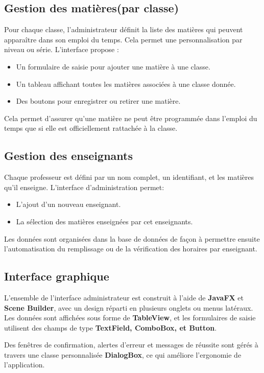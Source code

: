 \documentclass[english,12pt,a4paper]{report}
\begin{document}
 \subsection{Gestion des matières(par classe)}
 Pour chaque classe, l’administrateur définit la liste des matières qui peuvent apparaître dans son emploi du temps. Cela permet une personnalisation par niveau ou série. L’interface propose :
 \begin{itemize}
 	\item Un formulaire de saisie pour ajouter une matière à une classe.
 	\item Un tableau affichant toutes les matières associées à une classe donnée.
 	\item Des boutons pour enregistrer ou retirer une matière.
 \end{itemize}
 Cela permet d’assurer qu’une matière ne peut être programmée dans l’emploi du temps que si elle est officiellement rattachée à la classe.
 \subsection{Gestion des enseignants}
 Chaque professeur est défini par un nom complet, un identifiant, et les matières qu’il enseigne. L’interface d’administration permet:
 \begin{itemize}
 	\item L'ajout d’un nouveau enseignant.
 	\item La sélection des matières enseignées par cet enseignants.
 \end{itemize}
 Les données sont organisées dans la base de données de façon à permettre ensuite l’automatisation du remplissage ou de la vérification des horaires par enseignant.
 \subsection{Interface graphique}
 L’ensemble de l’interface administrateur est construit à l’aide de \textbf{JavaFX} et \textbf{Scene Builder}, avec un design réparti en plusieurs onglets ou menus latéraux. Les données sont affichées sous forme de \textbf{TableView}, et les formulaires de saisie utilisent des champs de type \textbf{TextField, ComboBox, et Button}.
 
 Des fenêtres de confirmation, alertes d’erreur et messages de réussite sont gérés à travers une classe personnalisée \textbf{DialogBox}, ce qui améliore l’ergonomie de l’application.
 
\end{document}
